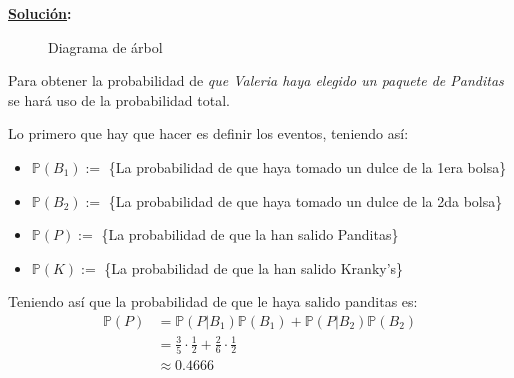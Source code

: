 \documentclass[11pt,letterpaper]{report}
\newcommand{\Pro}{\mathds{P}}
\newcommand{\sol}{\textbf{\underline{Solución}: }} %
\begin{document}
\begin{enumerate}
\sol 
\begin{figure}[H]
\centering
{}
\caption{Diagrama de árbol}
\end{figure}

Para obtener la probabilidad de \emph{que Valeria haya elegido un paquete de Panditas} se hará uso
de la probabilidad total.

Lo primero que hay que hacer es definir los eventos, teniendo así:
\begin{itemize}
    \item $\Pro(B_1) := $ \{La probabilidad de que haya tomado un dulce de la 1era bolsa\}
    \item $\Pro(B_2) := $ \{La probabilidad de que haya tomado un dulce de la 2da bolsa\}
    \item $\Pro(P) := $ \{La probabilidad de que la han salido Panditas\}
    \item $\Pro(K) := $ \{La probabilidad de que la han salido Kranky's\}
\end{itemize}

Teniendo así que la probabilidad de que le haya salido panditas es:
\begin{align*}
    \Pro(P)
        &= \Pro(P | B_1) \Pro(B_1) + \Pro(P | B_2) \Pro(B_2)\\
        &= \frac{3}{5} \cdot \frac{1}{2} + \frac{2}{6} \cdot \frac{1}{2}\\
        &\approx 0.4666
\end{align*}


\end{enumerate}
\end{document}
